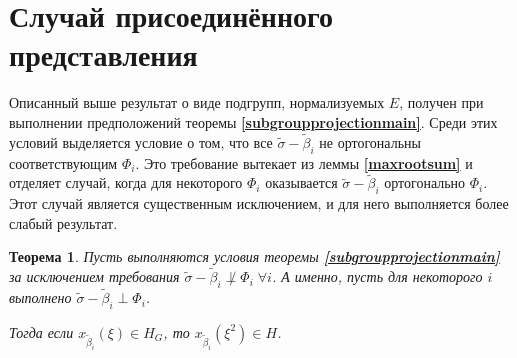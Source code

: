 \documentclass[12pt]{matmex-diploma}
\theoremstyle{mystyleni}
\theoremstyle{mystyle}
\newtheorem{thm}{Теорема}
\newcommand\refb[1]{\textbf{\ref{#1}}}
\begin{document}
\section{Случай присоединённого представления}

Описанный выше результат о виде подгрупп, нормализуемых $E$, получен при выполнении предположений теоремы \refb{subgroupprojectionmain}. Среди этих условий выделяется условие о том, что все $\widetilde\sigma-\widetilde\beta_i$ не ортогональны соответствующим $\Phi_i$. Это требование вытекает из леммы \refb{maxrootsum} и отделяет случай, когда для некоторого $\Phi_i$ оказывается $\widetilde\sigma-\widetilde\beta_i$ ортогонально $\Phi_i$. Этот случай является существенным исключением, и для него выполняется более слабый результат.

\begin{thm}
Пусть выполняются условия теоремы \refb{subgroupprojectionmain} за исключением требования $\widetilde\sigma-\widetilde\beta_i \not\perp \Phi_i \; \forall i$. А именно, пусть для некоторого $i$ выполнено $\widetilde\sigma-\widetilde\beta_i \perp \Phi_i$.

Тогда если $x_{\widetilde\beta_i}(\xi) \in H_G$, то $x_{\widetilde\beta_i}(\xi^2) \in H$.
\end{thm}
\end{document}
